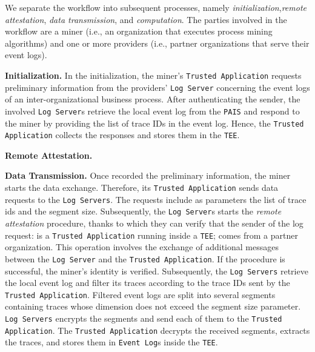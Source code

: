 We separate the workflow into subsequent processes, namely \textit{initialization},\textit{remote attestation}, \textit{data transmission}, and \textit{computation}.
The parties involved in the workflow are a miner (i.e., an organization that executes process mining algorithms) and one or more providers (i.e., partner organizations that serve their event logs). %

\textbf{Initialization.} In the initialization, the miner's \texttt{Trusted Application} requests preliminary information from the providers' \texttt{Log Server} concerning the event logs of an inter-organizational business process. After authenticating the sender, the involved \texttt{Log Server}s retrieve the local event log from the \texttt{PAIS} and respond to the miner by providing the list of trace IDs in the event log. Hence, the \texttt{Trusted Application} collects the responses and stores them in the \texttt{TEE}.

\textbf{Remote Attestation.} 

\textbf{Data Transmission.} Once recorded the preliminary information, the miner starts the data exchange. Therefore, its \texttt{Trusted Application} sends data requests to the \texttt{Log Servers}. The requests include as parameters the list of trace ids and the segment size. Subsequently, the \texttt{Log Server}s starts the \textit{remote attestation} procedure, thanks to which they can verify that the sender of the log request: is a \texttt{Trusted Application} running inside a \texttt{TEE}; comes from a partner organization. This operation involves the exchange of additional messages between the \texttt{Log Server} and the \texttt{Trusted Application}. If the procedure is successful, the miner's identity is verified.
Subsequently, the \texttt{Log Servers} retrieve the local event log and filter its traces according to the trace IDs sent by the \texttt{Trusted Application}. Filtered event logs are split into several segments containing traces whose dimension does not exceed the segment size parameter. \texttt{Log Servers} encrypts the segments and send each of them to the \texttt{Trusted Application}. The \texttt{Trusted Application} decrypts the received segments, extracts the traces, and stores them in \texttt{Event Log}s inside the \texttt{TEE}.


